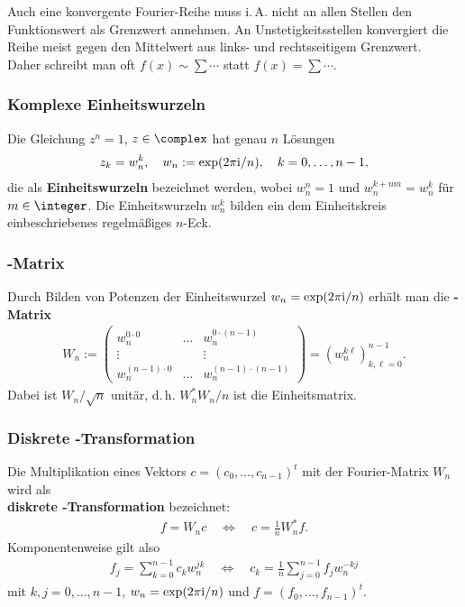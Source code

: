 \linie

Auch eine konvergente Fourier-Reihe muss i.\,A. nicht an allen Stellen den
Funktionswert als Grenzwert annehmen.
An Unstetigkeitsstellen konvergiert die Reihe meist gegen den Mittelwert
aus links- und rechtsseitigem Grenzwert. \\
Daher schreibt man oft $f(x) \sim \sum \dotsb$ statt
$f(x) = \sum \dotsb$.

\subsubsection{%
    Komplexe Einheitswurzeln%
}

Die Gleichung $z^n = 1$, $z \in \complex$ hat genau $n$ Lösungen
\begin{align*}
    z_k = w_n^k, \quad
    w_n := \exp(2 \pi \mathrm{i} / n), \quad
    k = 0, \dotsc, n - 1,
\end{align*}
die als \textbf{Einheitswurzeln} bezeichnet werden, wobei $w_n^n = 1$ und
$w_n^{k + nm} = w_n^k$ für $m \in \integer$.
Die Einheitswurzeln $w_n^k$ bilden ein dem Einheitskreis einbeschriebenes
regelmäßiges $n$-Eck.

\subsubsection{%
    -Matrix%
}

Durch Bilden von Potenzen der Einheitswurzel $w_n = \exp(2 \pi \mathrm{i} / n)$
erhält man die \textbf{-Matrix}
\begin{align*}
    W_n :=
    \begin{pmatrix}
        w_n^{0 \cdot 0} & \dots & w_n^{0 \cdot (n - 1)} \\
        \vdots & & \vdots \\
        w_n^{(n - 1) \cdot 0} & \dots & w_n^{(n - 1) \cdot (n - 1)}
    \end{pmatrix} =
    (w_n^{k\ell})_{k,\ell=0}^{n-1}.
\end{align*}
Dabei ist $W_n/\sqrt{n}$ unitär, d.\,h. $W_n^\ast W_n/n$ ist die
Einheitsmatrix.

\subsubsection{%
    Diskrete -Transformation%
}

Die Multiplikation eines Vektors $c = (c_0, \dotsc, c_{n-1})^t$ mit der
Fourier-Matrix $W_n$ wird als \\
\textbf{diskrete -Transformation}
bezeichnet:
\begin{align*}
    f = W_n c \quad\Leftrightarrow\quad
    c = \frac{1}{n} W_n^\ast f.
\end{align*}
Komponentenweise gilt also
\begin{align*}
    f_j = \sum_{k=0}^{n-1} c_k w_n^{jk} \quad\Leftrightarrow\quad
    c_k = \frac{1}{n} \sum_{j=0}^{n-1} f_j w_n^{-kj}
\end{align*}
mit $k, j = 0, \dotsc, n - 1$, $w_n = \exp(2 \pi \mathrm{i} / n)$ und
$f = (f_0, \dotsc, f_{n-1})^t$.

